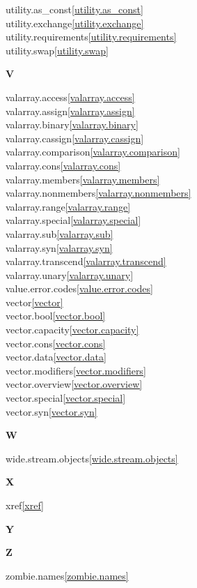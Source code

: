 \begin{multicols}{2}
utility.as_const\quad\ref{utility.as_const}\\
utility.exchange\quad\ref{utility.exchange}\\
utility.requirements\quad\ref{utility.requirements}\\
utility.swap\quad\ref{utility.swap}\\
\par \textbf{V}\par
valarray.access\quad\ref{valarray.access}\\
valarray.assign\quad\ref{valarray.assign}\\
valarray.binary\quad\ref{valarray.binary}\\
valarray.cassign\quad\ref{valarray.cassign}\\
valarray.comparison\quad\ref{valarray.comparison}\\
valarray.cons\quad\ref{valarray.cons}\\
valarray.members\quad\ref{valarray.members}\\
valarray.nonmembers\quad\ref{valarray.nonmembers}\\
valarray.range\quad\ref{valarray.range}\\
valarray.special\quad\ref{valarray.special}\\
valarray.sub\quad\ref{valarray.sub}\\
valarray.syn\quad\ref{valarray.syn}\\
valarray.transcend\quad\ref{valarray.transcend}\\
valarray.unary\quad\ref{valarray.unary}\\
value.error.codes\quad\ref{value.error.codes}\\
vector\quad\ref{vector}\\
vector.bool\quad\ref{vector.bool}\\
vector.capacity\quad\ref{vector.capacity}\\
vector.cons\quad\ref{vector.cons}\\
vector.data\quad\ref{vector.data}\\
vector.modifiers\quad\ref{vector.modifiers}\\
vector.overview\quad\ref{vector.overview}\\
vector.special\quad\ref{vector.special}\\
vector.syn\quad\ref{vector.syn}\\
\par \textbf{W}\par
wide.stream.objects\quad\ref{wide.stream.objects}\\
\par \textbf{X}\par
xref\quad\ref{xref}\\
\par \textbf{Y}\par
\par \textbf{Z}\par
zombie.names\quad\ref{zombie.names}\\
\end{multicols}

